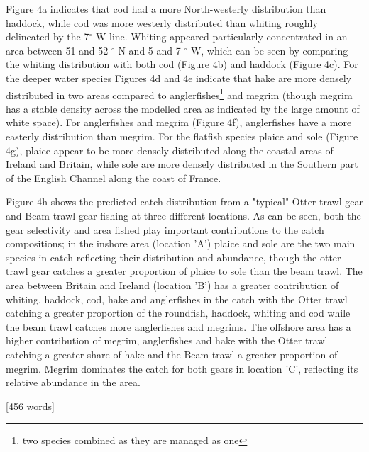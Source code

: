 \documentclass{nature}
\begin{document}
\begin{linenumbers}
Figure 4a indicates that cod had a more North-westerly distribution than
haddock, while cod was more westerly distributed than whiting roughly
delineated by the 7$^{\circ}$ W line. Whiting appeared particularly
concentrated in an area between 51 and 52 $^{\circ}$ N and 5 and 7 $^{\circ}$
W, which can be seen by comparing the whiting distribution with both cod
(Figure 4b) and haddock (Figure 4c). For the deeper water species Figures 4d
and 4e indicate that hake are more densely distributed in two areas compared to
anglerfishes\footnote{two species combined as they are managed as one} and
megrim (though megrim has a stable density across the modelled area as
indicated by the large amount of white space). For anglerfishes and megrim
(Figure 4f), anglerfishes have a more easterly distribution than megrim. For
the flatfish species plaice and sole (Figure 4g), plaice appear to be more
densely distributed along the coastal areas of Ireland and Britain, while sole
are more densely distributed in the Southern part of the English Channel along
the coast of France.

Figure 4h shows the predicted catch distribution from a "typical" Otter trawl
gear and Beam trawl gear fishing at three different locations. As can be seen,
both the gear selectivity and area fished play important contributions to the
catch compositions; in the inshore area (location 'A') plaice and sole are the
two main species in catch reflecting their distribution and abundance, though
the otter trawl gear catches a greater proportion of plaice to sole than the
beam trawl.  The area between Britain and Ireland (location 'B') has a greater
contribution of whiting, haddock, cod, hake and anglerfishes in the catch with
the Otter trawl catching a greater proportion of the roundfish, haddock,
whiting and cod while the beam trawl catches more anglerfishes and megrims. The
offshore area has a higher contribution of megrim, anglerfishes and hake with
the Otter trawl catching a greater share of hake and the Beam trawl a greater
proportion of megrim. Megrim dominates the catch for both gears in location
'C', reflecting its relative abundance in the area.  

[456 words]


\end{linenumbers}
\end{document}
